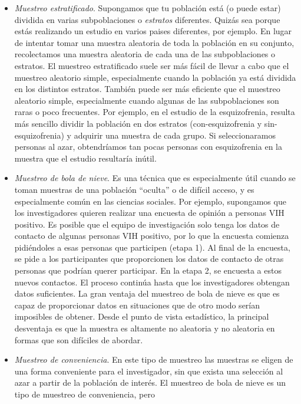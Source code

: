 \documentclass[spanish,]{book}
\begin{document}
\begin{itemize}
\item
  \emph{Muestreo estratificado}. Supongamos que tu población está (o
  puede estar) dividida en varias subpoblaciones o \emph{estratos}
  diferentes. Quizás sea porque estás realizando un estudio en varios
  paises diferentes, por ejemplo. En lugar de intentar tomar una muestra
  aleatoria de toda la población en su conjunto, recolectamos una
  muestra aleatoria de cada una de las subpoblaciones o estratos. El
  muestreo estratificado suele ser más fácil de llevar a cabo que el
  muestreo aleatorio simple, especialmente cuando la población ya está
  dividida en los distintos estratos. También puede ser más eficiente
  que el muestreo aleatorio simple, especialmente cuando algunas de las
  subpoblaciones son raras o poco frecuentes. Por ejemplo, en el estudio
  de la esquizofrenia, resulta más sencillo dividir la población en dos
  estratos (con-esquizofrenia y sin-esquizofrenia) y adquirir una
  muestra de cada grupo. Si seleccionaramos personas al azar,
  obtendríamos tan pocas personas con esquizofrenia en la muestra que el
  estudio resultaría inútil.
\item
  \emph{Muestreo de bola de nieve}. Es una técnica que es especialmente
  útil cuando se toman muestras de una población ``oculta'' o de difícil
  acceso, y es especialmente común en las ciencias sociales. Por
  ejemplo, supongamos que los investigadores quieren realizar una
  encuesta de opinión a personas VIH positivo. Es posible que el equipo
  de investigación solo tenga los datos de contacto de algunas personas
  VIH positivo, por lo que la encuesta comienza pidiéndoles a esas
  personas que participen (etapa 1). Al final de la encuesta, se pide a
  los participantes que proporcionen los datos de contacto de otras
  personas que podrían querer participar. En la etapa 2, se encuesta a
  estos nuevos contactos. El proceso continúa hasta que los
  investigadores obtengan datos suficientes. La gran ventaja del
  muestreo de bola de nieve es que es capaz de proporcionar datos en
  situaciones que de otro modo serían imposibles de obtener. Desde el
  punto de vista estadístico, la principal desventaja es que la muestra
  es altamente no aleatoria y no aleatoria en formas que son difíciles
  de abordar.
\item
  \emph{Muestreo de conveniencia}. En este tipo de muestreo las muestras
  se eligen de una forma conveniente para el investigador, sin que
  exista una selección al azar a partir de la población de interés. El
  muestreo de bola de nieve es un tipo de muestreo de conveniencia, pero

\end{itemize}
\end{document}
